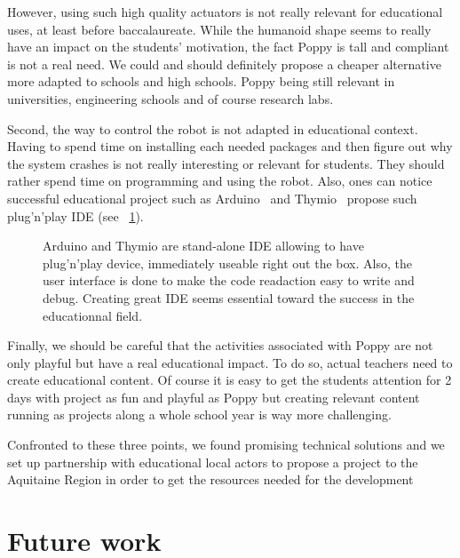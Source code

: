 However, using such high quality actuators is not really relevant for educational uses, at least before baccalaureate. While the humanoid shape seems to really have an impact on the students’ motivation, the fact Poppy is tall and compliant is not a real need. We could and should definitely propose a cheaper alternative more adapted to schools and high schools. Poppy being still relevant in universities, engineering schools and of course research labs.

Second, the way to control the robot is not adapted in educational context. Having to spend time on installing each needed packages and then figure out why the system crashes is not really interesting or relevant for students. They should rather spend time on programming and using the robot. Also, ones can notice successful educational project such as Arduino~\cite{banzi2009getting} and Thymio~\cite{shin2014visual}  propose such plug'n'play IDE (see \figurename~\ref{fig:eductationnal IDE}).

\begin{figure}[]
\centering
    \hfil
    \caption{Arduino and Thymio are stand-alone IDE allowing to have plug'n'play device, immediately useable right out the box. Also, the user interface is done to make the code readaction easy to write and debug. Creating great IDE seems essential toward the success in the educationnal field.}
    \label{fig:eductationnal IDE}
\end{figure}


Finally, we should be careful that the activities associated with Poppy are not only playful but have a real educational impact. To do so, actual teachers need to create educational content. Of course it is easy to get the students attention for 2 days with project as fun and playful as Poppy but creating relevant content running as projects along a whole school year is way more challenging.

Confronted to these three points, we found promising technical solutions and we set up partnership with educational local actors to propose a project to the Aquitaine Region in order to get the resources needed for the development


\section{Future work} %

